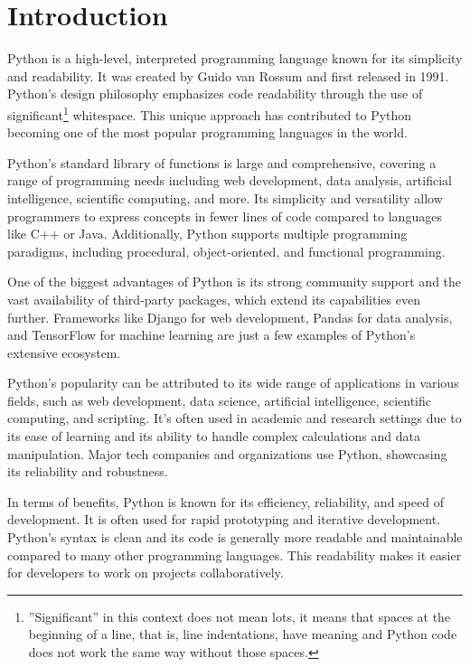 %
%

\section{Introduction}

Python is a high-level, interpreted programming language known for its simplicity and readability. It was created by Guido van Rossum and first released in 1991. Python's design philosophy emphasizes code readability through the use of significant\footnote{''Significant'' in this context does not mean lots, it means that spaces at the beginning of a line, that is, line indentations, have meaning and Python code does not work the same way without those spaces.} whitespace. This unique approach has contributed to Python becoming one of the most popular programming languages in the world.

Python's standard library of functions is large and comprehensive, covering a range of programming needs including web development, data analysis, artificial intelligence, scientific computing, and more. Its simplicity and versatility allow programmers to express concepts in fewer lines of code compared to languages like C++ or Java. Additionally, Python supports multiple programming paradigms, including procedural, object-oriented, and functional programming.

One of the biggest advantages of Python is its strong community support and the vast availability of third-party packages, which extend its capabilities even further. Frameworks like Django for web development, Pandas for data analysis, and TensorFlow for machine learning are just a few examples of Python's extensive ecosystem.

Python's popularity can be attributed to its wide range of applications in various fields, such as web development, data science, artificial intelligence, scientific computing, and scripting. It's often used in academic and research settings due to its ease of learning and its ability to handle complex calculations and data manipulation. Major tech companies and organizations use Python, showcasing its reliability and robustness.

In terms of benefits, Python is known for its efficiency, reliability, and speed of development. It is often used for rapid prototyping and iterative development. Python's syntax is clean and its code is generally more readable and maintainable compared to many other programming languages. This readability makes it easier for developers to work on projects collaboratively.

